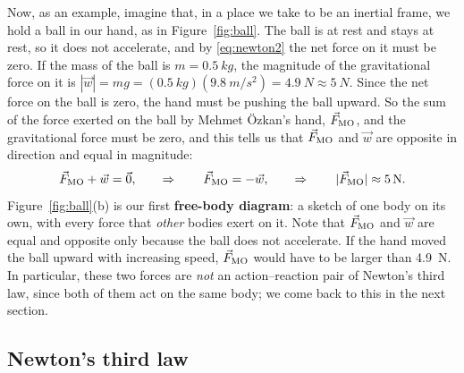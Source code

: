 \documentclass[11pt,a4paper]{article}
\begin{document}
Now, as an example, imagine that, in a place we take to be an inertial frame, we hold a ball in our
hand, as in Figure~\ref{fig:ball}. The ball is at rest and stays at rest, so it does not accelerate,
and by \eqref{eq:newton2} the net force on it must be zero. If the mass of the ball is $m =
\qty{0.5}{kg}$, the magnitude of the gravitational force on it is $|\vec{w}| = mg =
(\qty{0.5}{kg})(\qty{9.8}{m/s^2}) = \qty{4.9}{N} \approx \qty{5}{N}$. Since the net force on the
ball is zero, the hand must be pushing the ball upward. So the sum of the force exerted on the ball
by Mehmet \"Ozkan's hand, $\vec{F}_{\mathrm{MO}}$, and the gravitational force must be zero, and this tells
us that $\vec{F}_{\mathrm{MO}}$ and $\vec{w}$ are opposite in direction and equal in magnitude:
\begin{equation}\label{eq:hand}
  \vec{F}_{\mathrm{MO}} + \vec{w} = \vec{0} , \qquad \Rightarrow \qquad
  \vec{F}_{\mathrm{MO}} = -\vec{w} , \qquad \Rightarrow \qquad |\vec{F}_{\mathrm{MO}}| \approx \qty{5}{N} .
\end{equation}
Figure~\ref{fig:ball}(b) is our first \textbf{free-body diagram}: a sketch of one body on its own,
with every force that \emph{other} bodies exert on it. Note that $\vec{F}_{\mathrm{MO}}$ and $\vec{w}$ are
equal and opposite only because the ball does not accelerate. If the hand moved the ball upward
with increasing speed, $\vec{F}_{\mathrm{MO}}$ would have to be larger than \qty{4.9}{N}. In particular,
these two forces are \emph{not} an action--reaction pair of Newton's third law, since both of them
act on the same body; we come back to this in the next section.

\subsection{Newton's third law}\label{sec:third}
\end{document}
